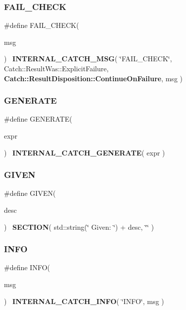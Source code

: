 \subsubsection{F\+A\+I\+L\+\_\+\+C\+H\+E\+CK}
{\footnotesize\ttfamily \#define F\+A\+I\+L\+\_\+\+C\+H\+E\+CK(\begin{DoxyParamCaption}\item[{}]{msg }\end{DoxyParamCaption})~\textbf{ I\+N\+T\+E\+R\+N\+A\+L\+\_\+\+C\+A\+T\+C\+H\+\_\+\+M\+SG}( \char`\"{}F\+A\+I\+L\+\_\+\+C\+H\+E\+CK\char`\"{}, Catch\+::\+Result\+Was\+::\+Explicit\+Failure, \textbf{ Catch\+::\+Result\+Disposition\+::\+Continue\+On\+Failure}, msg )}

\mbox{\label{catch_8hpp_af66c8a03872c4e1a9f412475f83adbe8}} 
\subsubsection{G\+E\+N\+E\+R\+A\+TE}
{\footnotesize\ttfamily \#define G\+E\+N\+E\+R\+A\+TE(\begin{DoxyParamCaption}\item[{}]{expr }\end{DoxyParamCaption})~\textbf{ I\+N\+T\+E\+R\+N\+A\+L\+\_\+\+C\+A\+T\+C\+H\+\_\+\+G\+E\+N\+E\+R\+A\+TE}( expr )}

\mbox{\label{catch_8hpp_a2b70c603786d759242856d883dbe93bd}} 
\subsubsection{G\+I\+V\+EN}
{\footnotesize\ttfamily \#define G\+I\+V\+EN(\begin{DoxyParamCaption}\item[{}]{desc }\end{DoxyParamCaption})~\textbf{ S\+E\+C\+T\+I\+ON}( std\+::string(\char`\"{}   Given\+: \char`\"{}) + desc, \char`\"{}\char`\"{} )}

\mbox{\label{catch_8hpp_a3ae64706314066fdc8b6c8029a915aa7}} 
\subsubsection{I\+N\+FO}
{\footnotesize\ttfamily \#define I\+N\+FO(\begin{DoxyParamCaption}\item[{}]{msg }\end{DoxyParamCaption})~\textbf{ I\+N\+T\+E\+R\+N\+A\+L\+\_\+\+C\+A\+T\+C\+H\+\_\+\+I\+N\+FO}( \char`\"{}I\+N\+FO\char`\"{}, msg )}

